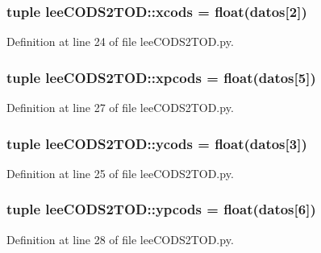 \subsubsection[{xcods}]{\setlength{\rightskip}{0pt plus 5cm}tuple {\bf lee\-C\-O\-D\-S2\-T\-O\-D\-::xcods} = float({\bf datos}[2])}\label{namespacelee_c_o_d_s2_t_o_d_a7af23be84bda27bd85366ffe50e81fde}


\-Definition at line 24 of file lee\-C\-O\-D\-S2\-T\-O\-D.\-py.

\subsubsection[{xpcods}]{\setlength{\rightskip}{0pt plus 5cm}tuple {\bf lee\-C\-O\-D\-S2\-T\-O\-D\-::xpcods} = float({\bf datos}[5])}\label{namespacelee_c_o_d_s2_t_o_d_a1420af9db9f5bc92ef64ca4146dc7419}


\-Definition at line 27 of file lee\-C\-O\-D\-S2\-T\-O\-D.\-py.

\subsubsection[{ycods}]{\setlength{\rightskip}{0pt plus 5cm}tuple {\bf lee\-C\-O\-D\-S2\-T\-O\-D\-::ycods} = float({\bf datos}[3])}\label{namespacelee_c_o_d_s2_t_o_d_a4dc06da1afe86e15a8541604012ced44}


\-Definition at line 25 of file lee\-C\-O\-D\-S2\-T\-O\-D.\-py.

\subsubsection[{ypcods}]{\setlength{\rightskip}{0pt plus 5cm}tuple {\bf lee\-C\-O\-D\-S2\-T\-O\-D\-::ypcods} = float({\bf datos}[6])}\label{namespacelee_c_o_d_s2_t_o_d_a8e3465da035af5b9d8c5c6b2a064009d}


\-Definition at line 28 of file lee\-C\-O\-D\-S2\-T\-O\-D.\-py.

